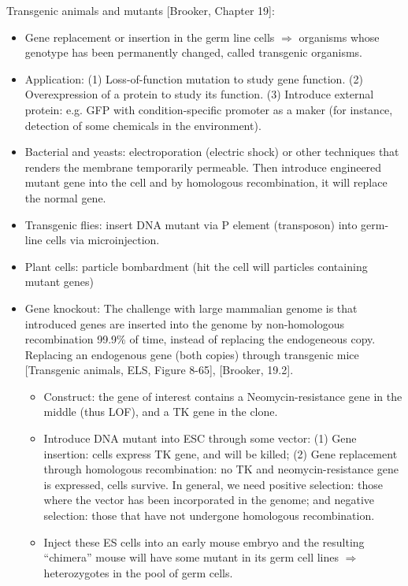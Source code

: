 \documentclass{report}
\begin{document}
Transgenic animals and mutants [Brooker, Chapter 19]:  
\begin{itemize}
	\item Gene replacement or insertion in the germ line cells $\Rightarrow$ organisms whose genotype has been permanently changed, called transgenic organisms.
	
	\item Application: (1) Loss-of-function mutation to study gene function. (2) Overexpression of a protein to study its function. (3) Introduce external protein: e.g. GFP with condition-specific promoter as a maker (for instance, detection of some chemicals in the environment). 
		
	\item Bacterial and yeasts: electroporation (electric shock) or other techniques that renders the membrane temporarily permeable. Then introduce engineered mutant gene into the cell and by homologous recombination, it will replace the normal gene.
	
	\item Transgenic flies: insert DNA mutant via P element (transposon) into germ-line cells via microinjection.  
	
	\item Plant cells: particle bombardment (hit the cell will particles containing mutant genes)
	
	\item Gene knockout: The challenge with large mammalian genome is that introduced genes are inserted into the genome by non-homologous recombination 99.9\% of time, instead of replacing the endogeneous copy. Replacing an endogenous gene (both copies) through transgenic mice [Transgenic animals, ELS, Figure 8-65], [Brooker, 19.2]. 
	\begin{itemize}
		\item Construct: the gene of interest contains a Neomycin-resistance gene in the middle (thus LOF), and a TK gene in the clone. 
		
		\item Introduce DNA mutant into ESC through some vector: (1) Gene insertion: cells express TK gene, and will be killed; (2) Gene replacement through homologous recombination: no TK and neomycin-resistance gene is expressed, cells survive. In general, we need positive selection: those where the vector has been incorporated in the genome; and negative selection: those that have not undergone homologous recombination. 
		
		\item Inject these ES cells into an early mouse embryo and the resulting ``chimera'' mouse will have some mutant in its germ cell lines $\Rightarrow$ heterozygotes in the pool of germ cells. 
		

\end{itemize}
\end{itemize}
\end{document}
